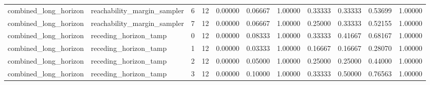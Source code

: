 \documentclass{article}
\begin{document}
\begin{table}[tbp]
{\begin{tabular}{lllllllllll}
combined\_long\_horizon & reachability\_margin\_sampler & 6 & 12 & 0.00000 & 0.06667 & 1.00000 & 0.33333 & 0.33333 & 0.53699 & 1.00000 \\
combined\_long\_horizon & reachability\_margin\_sampler & 7 & 12 & 0.00000 & 0.06667 & 1.00000 & 0.25000 & 0.33333 & 0.52155 & 1.00000 \\
combined\_long\_horizon & receding\_horizon\_tamp & 0 & 12 & 0.00000 & 0.08333 & 1.00000 & 0.33333 & 0.41667 & 0.68167 & 1.00000 \\
combined\_long\_horizon & receding\_horizon\_tamp & 1 & 12 & 0.00000 & 0.03333 & 1.00000 & 0.16667 & 0.16667 & 0.28070 & 1.00000 \\
combined\_long\_horizon & receding\_horizon\_tamp & 2 & 12 & 0.00000 & 0.05000 & 1.00000 & 0.25000 & 0.25000 & 0.44000 & 1.00000 \\
combined\_long\_horizon & receding\_horizon\_tamp & 3 & 12 & 0.00000 & 0.10000 & 1.00000 & 0.33333 & 0.50000 & 0.76563 & 1.00000 \\
\bottomrule
\end{tabular}
}
\end{table}

\clearpage
\end{document}
